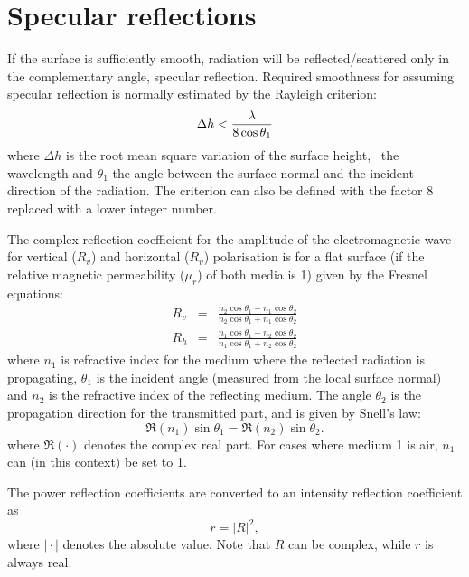 \section{Specular reflections}
 \label{sec:surface:surface:specular}
 
 If the surface is sufficiently smooth, radiation will be
 reflected/scattered only in the complementary angle, specular
 reflection. Required smoothness for assuming specular reflection is
 normally estimated by the Rayleigh criterion:
 \begin{equation}
   \label{eq:surface:rayleigh}
   \Delta h < \frac{\lambda}{8\cos\theta_1}
 \end{equation}
 where $\Delta h$ is the root mean square variation of the surface
 height, \Wvl\ the wavelength and $\theta_1$ the angle between the
 surface normal and the incident direction of the radiation. The
 criterion can also be defined with the factor 8 replaced with a lower
 integer number.
 
 The complex reflection coefficient for the amplitude of the
 electromagnetic wave for vertical ($R_v$) and horizontal ($R_v$)
 polarisation is for a flat surface (if the relative magnetic
 permeability ($\mu_r$) of both media is 1) given by the Fresnel equations:
 \begin{eqnarray}
   \label{eq:surface_fresnel}
   R_v &=& \frac{n_2\cos\theta_1-n_1\cos\theta_2}
                                           {n_2\cos\theta_1+n_1\cos\theta_2} \\
   R_h &=& \frac{n_1\cos\theta_1-n_2\cos\theta_2}
                                           {n_1\cos\theta_1+n_2\cos\theta_2} 
 \end{eqnarray}
 where $n_1$ is refractive index for the medium where the reflected
 radiation is propagating, $\theta_1$ is the incident angle (measured
 from the local surface normal) and $n_2$ is the refractive index of
 the reflecting medium. The angle $\theta_2$ is the propagation
 direction for the transmitted part, and is given by Snell's law:
 \begin{equation}
   \label{eq:surface:snell}
   \Re(n_1)\sin\theta_1 = \Re(n_2)\sin\theta_2.
 \end{equation}
 where $\Re(\cdot)$ denotes the complex real part.
 For cases where medium 1 is air, $n_1$ can (in this context) be set to 1.

 The power reflection coefficients are converted to an intensity
 reflection coefficient as
 \begin{equation}
   \label{eq:surface:R2r}
   r = |R|^2,
 \end{equation}
 where $|\!\cdot\!|$ denotes the absolute value. Note that $R$ can be
 complex, while $r$ is always real.

